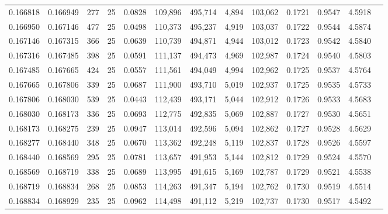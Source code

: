 \begin{tabular}{rrrrrrrrrrrrr}
0.166818 & 0.166949 &   277 &  25 &                                     0.0828 & 109,896 & 495,714 &   4,894 & 103,062 & 0.1721 & 0.9547 & 4.5918 \\
0.166950 & 0.167146 &   477 &  25 &                                     0.0498 & 110,373 & 495,237 &   4,919 & 103,037 & 0.1722 & 0.9544 & 4.5874 \\
0.167146 & 0.167315 &   366 &  25 &                                     0.0639 & 110,739 & 494,871 &   4,944 & 103,012 & 0.1723 & 0.9542 & 4.5840 \\
0.167316 & 0.167485 &   398 &  25 &                                     0.0591 & 111,137 & 494,473 &   4,969 & 102,987 & 0.1724 & 0.9540 & 4.5803 \\
0.167485 & 0.167665 &   424 &  25 &                                     0.0557 & 111,561 & 494,049 &   4,994 & 102,962 & 0.1725 & 0.9537 & 4.5764 \\
0.167665 & 0.167806 &   339 &  25 &                                     0.0687 & 111,900 & 493,710 &   5,019 & 102,937 & 0.1725 & 0.9535 & 4.5733 \\
0.167806 & 0.168030 &   539 &  25 &                                     0.0443 & 112,439 & 493,171 &   5,044 & 102,912 & 0.1726 & 0.9533 & 4.5683 \\
0.168030 & 0.168173 &   336 &  25 &                                     0.0693 & 112,775 & 492,835 &   5,069 & 102,887 & 0.1727 & 0.9530 & 4.5651 \\
0.168173 & 0.168275 &   239 &  25 &                                     0.0947 & 113,014 & 492,596 &   5,094 & 102,862 & 0.1727 & 0.9528 & 4.5629 \\
0.168277 & 0.168440 &   348 &  25 &                                     0.0670 & 113,362 & 492,248 &   5,119 & 102,837 & 0.1728 & 0.9526 & 4.5597 \\
0.168440 & 0.168569 &   295 &  25 &                                     0.0781 & 113,657 & 491,953 &   5,144 & 102,812 & 0.1729 & 0.9524 & 4.5570 \\
0.168569 & 0.168719 &   338 &  25 &                                     0.0689 & 113,995 & 491,615 &   5,169 & 102,787 & 0.1729 & 0.9521 & 4.5538 \\
0.168719 & 0.168834 &   268 &  25 &                                     0.0853 & 114,263 & 491,347 &   5,194 & 102,762 & 0.1730 & 0.9519 & 4.5514 \\
0.168834 & 0.168929 &   235 &  25 &                                     0.0962 & 114,498 & 491,112 &   5,219 & 102,737 & 0.1730 & 0.9517 & 4.5492 \\

\end{tabular}
